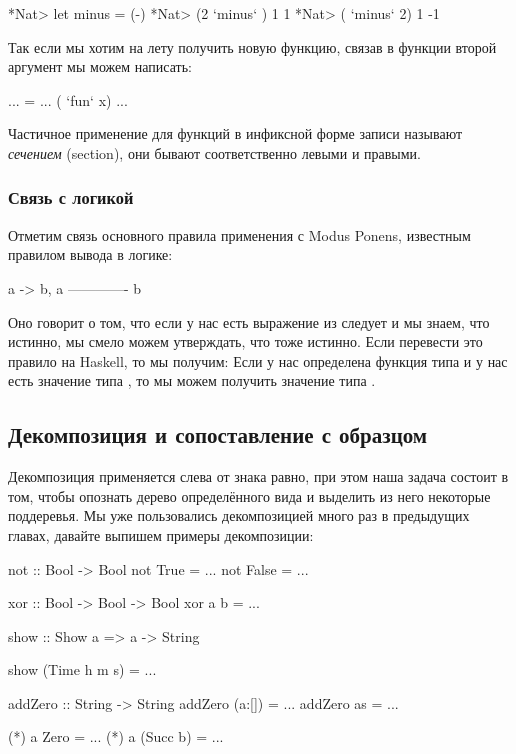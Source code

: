 \begin{code}
*Nat> let minus = (-)
*Nat> (2 `minus` ) 1
1
*Nat> ( `minus` 2) 1
-1
\end{code}

Так если мы хотим на лету получить новую функцию,
связав в функции второй аргумент мы можем написать:

\begin{code}
... = ... ( `fun` x) ...
\end{code}

Частичное применение для функций в инфиксной форме записи 
называют \emph{сечением} (section), они бывают соответственно
левыми и правыми.

\subsubsection{Связь с логикой}

Отметим связь основного правила применения с Modus Ponens,
известным правилом вывода в логике:

\begin{code}
                    a -> b,    a
                    -------------
                          b
\end{code}

Оно говорит о том, что если у нас есть выражение
из  следует  и мы знаем, что  истинно,
мы смело можем утверждать, что  тоже истинно.
Если перевести это правило на Haskell, то мы получим:
Если у нас определена функция типа  и 
у нас есть значение типа , то мы можем получить
значение типа .

\subsection{Декомпозиция и сопоставление с образцом}

Декомпозиция применяется слева от знака равно, при этом
наша задача состоит в том, чтобы опознать дерево определённого
вида и выделить из него некоторые поддеревья. Мы уже пользовались
декомпозицией много раз в предыдущих главах, давайте выпишем 
примеры декомпозиции:

\begin{code}
not :: Bool -> Bool
not True   = ...
not False  = ...

xor :: Bool -> Bool -> Bool
xor a b = ...

show :: Show a => a -> String

show (Time h m s) = ...

addZero :: String -> String
addZero (a:[])  = ...
addZero as      = ...

(*)  a   Zero      = ...
(*)  a   (Succ b)  = ...
\end{code}

